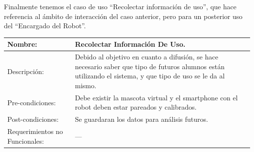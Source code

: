 \documentclass[letterpaper,12pt]{article} %
\numberwithin{equation}{section} %
\numberwithin{figure}{section} %
\numberwithin{table}{section} %
\begin{document}
%


Finalmente tenemos el caso de uso ``Recolectar informaci\'on de uso'', que hace referencia al \'ambito de interacci\'on del caso anterior, pero para un posterior uso del ``Encargado del Robot''.\\

\begin{table}[H]
  \centering
  \begin{tabular}{p{5cm}p{9cm}}\hline\hline
    Nombre: & Recolectar Informaci\'on De Uso.\\ \hline
    Descripci\'on: & Debido al objetivo en cuanto a difusi\'on, se hace necesario saber que tipo de futuros alumnos est\'an utilizando el sistema, y que tipo de uso se le da al mismo.\\ \hline %
    Pre-condiciones: & Debe existir la mascota virtual y el smartphone con el robot deben estar pareados y calibrados.\\ \hline
    Post-condiciones: & Se guardaran los datos para an\'alisis futuros.\\ \hline
    Requerimientos no Funcionales: & ---\\ \hline\hline %
  \end{tabular}
  \label{tab:Recolectar}
\end{table}
\end{document}
